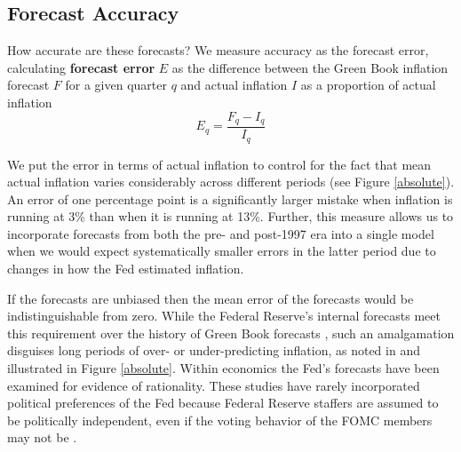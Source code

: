 \documentclass[a4paper]{article}\usepackage{graphicx, color}
\begin{document}
\subsection{Forecast Accuracy}\label{ForecastAcc}

How accurate are these forecasts? We measure accuracy as the forecast error,  calculating {\bf{forecast error}} $E$ as the difference between the Green Book inflation forecast $F$ for a given quarter $q$ and actual inflation $I$ as a proportion of actual inflation
%
\begin{equation}
    E_{q} = \frac{F_{q} - I_{q}}{I_{q}}
\end{equation}
%

We put the error in terms of actual inflation to control for the fact that mean actual inflation varies considerably across different periods (see Figure \ref{absolute}). An error of one percentage point is a significantly larger mistake when inflation is running at 3\% than when it is running at 13\%. Further, this measure allows us to incorporate forecasts from both the pre- and post-1997 era into a single model when we would expect systematically smaller errors in the latter period due to changes in how the Fed estimated inflation. 

If the forecasts are unbiased then the mean error of the forecasts would be indistinguishable from zero. While the Federal Reserve's internal forecasts meet this requirement over the history of Green Book forecasts \citep{Romer2000}, such an amalgamation disguises long periods of over- or under-predicting inflation, as noted in \cite{Capistran2006} and illustrated in Figure \ref{absolute}. Within economics the Fed's forecasts have been examined for evidence of rationality. These studies have rarely incorporated political preferences of the Fed because Federal Reserve staffers are assumed to be politically independent, even if the voting behavior of the FOMC members may not be \citep{Clark2011}.
\end{document}
